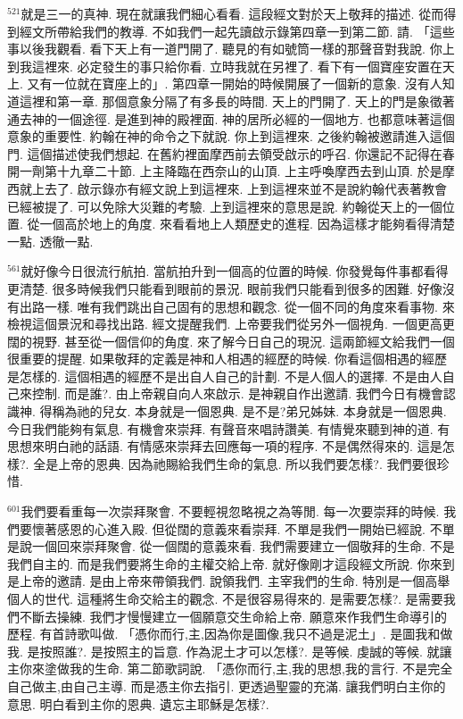 \documentclass{book}
\begin{document}
$^{521}$就是三一的真神.
現在就讓我們細心看看.
這段經文對於天上敬拜的描述.
從而得到經文所帶給我們的教導.
不如我們一起先讀啟示錄第四章一到第二節.
請.
「這些事以後我觀看.
看下天上有一道門開了.
聽見的有如號筒一樣的那聲音對我說.
你上到我這裡來.
必定發生的事只給你看.
立時我就在另裡了.
看下有一個寶座安置在天上.
又有一位就在寶座上的」.
第四章一開始的時候開展了一個新的意象.
沒有人知道這裡和第一章.
那個意象分隔了有多長的時間.
天上的門開了.
天上的門是象徵著通去神的一個途徑.
是進到神的殿裡面.
神的居所必經的一個地方.
也都意味著這個意象的重要性.
約翰在神的命令之下就說.
你上到這裡來.
之後約翰被邀請進入這個門.
這個描述使我們想起.
在舊約裡面摩西前去領受啟示的呼召.
你還記不記得在春開一劑第十九章二十節.
上主降臨在西奈山的山頂.
上主呼喚摩西去到山頂.
於是摩西就上去了.
啟示錄亦有經文說上到這裡來.
上到這裡來並不是說約翰代表著教會已經被提了.
可以免除大災難的考驗.
上到這裡來的意思是說.
約翰從天上的一個位置.
從一個高於地上的角度.
來看看地上人類歷史的進程.
因為這樣才能夠看得清楚一點.
透徹一點.

$^{561}$就好像今日很流行航拍.
當航拍升到一個高的位置的時候.
你發覺每件事都看得更清楚.
很多時候我們只能看到眼前的景況.
眼前我們只能看到很多的困難.
好像沒有出路一樣.
唯有我們跳出自己固有的思想和觀念.
從一個不同的角度來看事物.
來檢視這個景況和尋找出路.
經文提醒我們.
上帝要我們從另外一個視角.
一個更高更闊的視野.
甚至從一個信仰的角度.
來了解今日自己的現況.
這兩節經文給我們一個很重要的提醒.
如果敬拜的定義是神和人相遇的經歷的時候.
你看這個相遇的經歷是怎樣的.
這個相遇的經歷不是出自人自己的計劃.
不是人個人的選擇.
不是由人自己來控制.
而是誰?.
由上帝親自向人來啟示.
是神親自作出邀請.
我們今日有機會認識神.
得稱為祂的兒女.
本身就是一個恩典.
是不是?弟兄姊妹.
本身就是一個恩典.
今日我們能夠有氣息.
有機會來崇拜.
有聲音來唱詩讚美.
有情覺來聽到神的道.
有思想來明白祂的話語.
有情感來崇拜去回應每一項的程序.
不是偶然得來的.
這是怎樣?.
全是上帝的恩典.
因為祂賜給我們生命的氣息.
所以我們要怎樣?.
我們要很珍惜.

$^{601}$我們要看重每一次崇拜聚會.
不要輕視忽略視之為等閒.
每一次要崇拜的時候.
我們要懷著感恩的心進入殿.
但從闊的意義來看崇拜.
不單是我們一開始已經說.
不單是說一個回來崇拜聚會.
從一個闊的意義來看.
我們需要建立一個敬拜的生命.
不是我們自主的.
而是我們要將生命的主權交給上帝.
就好像剛才這段經文所說.
你來到是上帝的邀請.
是由上帝來帶領我們.
說領我們.
主宰我們的生命.
特別是一個高舉個人的世代.
這種將生命交給主的觀念.
不是很容易得來的.
是需要怎樣?.
是需要我們不斷去操練.
我們才慢慢建立一個願意交生命給上帝.
願意來作我們生命導引的歷程.
有首詩歌叫做.
「憑你而行,主,因為你是圖像,我只不過是泥土」.
是圖我和做我.
是按照誰?.
是按照主的旨意.
作為泥土才可以怎樣?.
是等候.
虔誠的等候.
就讓主你來塗做我的生命.
第二節歌詞說.
「憑你而行,主,我的思想,我的言行.
不是完全自己做主,由自己主導.
而是憑主你去指引.
更透過聖靈的充滿.
讓我們明白主你的意思.
明白看到主你的恩典.
遺忘主耶穌是怎樣?.
\end{document}
